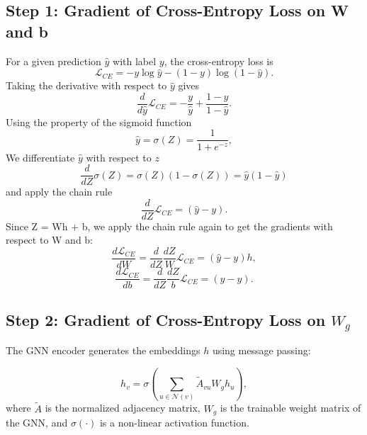\documentclass[12pt]{article}
\begin{document}
\subsection*{Step 1: Gradient of Cross-Entropy Loss on W and b}
For a given prediction $\hat{y}$ with label $y$, the cross-entropy loss is
\begin{equation*}
    \mathcal{L}_{CE} = - y \log \hat{y} - (1 - y) \log (1 - \hat{y}).
\end{equation*}
Taking the derivative with respect to $\hat{y}$ gives
\begin{equation*}
    \frac{d}{d\hat{y}} \mathcal{L}_{CE} = -\frac{y}{\hat{y}} + \frac{1 - y}{1 - \hat{y}}.
\end{equation*}
Using the property of the sigmoid function
\begin{equation*}
    \hat{y} = \sigma(Z) = \frac{1}{1 + e^{-z}},
\end{equation*}
We differentiate $\hat{y}$ with respect to $z$
\begin{equation*}
    \frac{d}{dZ} \sigma(Z) = \sigma(Z)(1 - \sigma(Z)) = \hat{y} (1 - \hat{y})
\end{equation*}
and apply the chain rule
\begin{equation*}
    \frac{d}{dZ} \mathcal{L}_{CE} = (\hat{y} - y).
\end{equation*}
Since Z = Wh + b, we apply the chain rule again to get the gradients with respect to W and b:
\begin{equation*}
    \frac{d\mathcal{L}_{CE}}{dW} = \frac{d}{dZ} \frac{dZ}{W}\mathcal{L}_{CE} = (\hat{y} - y)h,
\end{equation*}
\begin{equation*}
     \frac{d\mathcal{L}_{CE}}{db} = \frac{d}{dZ} \frac{dZ}{b}\mathcal{L}_{CE} = (\hat{y} - y).
\end{equation*}

\subsection*{Step 2: Gradient of Cross-Entropy Loss on $W_g$}
The GNN encoder generates the embeddings $h$ using message passing:

\begin{equation*}
    h_v = \sigma \left( \sum_{u \in \mathcal{N}(v)} \tilde{A}_{vu} W_g h_u \right),
\end{equation*}
where $\tilde{A}$ is the normalized adjacency matrix, $W_g$ is the trainable weight matrix of the GNN, and $\sigma(\cdot)$ is a non-linear activation function.
\end{document}
